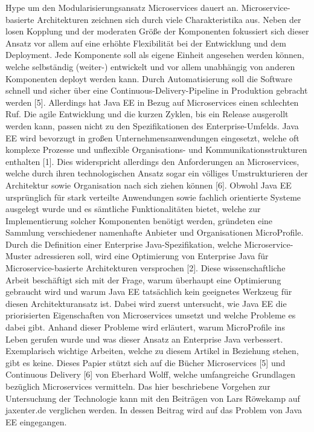  Hype um den Modularisierungsansatz Microservices dauert an. Microservice-basierte Architekturen zeichnen sich durch viele Charakteristika aus. Neben der losen Kopplung und der moderaten Größe der Komponenten fokussiert sich dieser Ansatz vor allem auf eine erhöhte Flexibilität bei der Entwicklung und dem Deployment. Jede Komponente soll als eigene Einheit angesehen werden können, welche selbständig (weiter-) entwickelt und vor allem unabhängig von anderen Komponenten deployt werden kann. Durch Automatisierung soll die Software schnell und sicher über eine Continuous-Delivery-Pipeline in Produktion gebracht werden [5]. Allerdings hat Java EE in Bezug auf Microservices einen schlechten Ruf. Die agile Entwicklung und die kurzen Zyklen, bis ein Release ausgerollt werden kann, passen nicht zu den Spezifikationen des Enterprise-Umfelds. Java EE wird bevorzugt in großen Unternehmensanwendungen eingesetzt, welche oft komplexe Prozesse und unflexible Organisations- und Kommunikationsstrukturen enthalten [1]. Dies widerspricht allerdings den Anforderungen an Microservices, welche durch ihren technologischen Ansatz sogar ein völliges Umstrukturieren der Architektur sowie Organisation nach sich ziehen können [6]. Obwohl Java EE ursprünglich für stark verteilte Anwendungen sowie fachlich orientierte Systeme ausgelegt wurde und es sämtliche Funktionalitäten bietet, welche zur Implementierung solcher Komponenten benötigt werden, gründeten eine Sammlung verschiedener namenhafte Anbieter und Organisationen MicroProfile.\\
Durch die Definition einer Enterprise Java-Spezifikation, welche Microservice-Muster adressieren soll, wird eine Optimierung von Enterprise Java für Microservice-basierte Architekturen versprochen [2]. Diese wissenschaftliche Arbeit beschäftigt sich mit der Frage, warum überhaupt eine Optimierung gebraucht wird und warum Java EE tatsächlich kein geeignetes Werkzeug für diesen Architekturansatz ist. Dabei wird zuerst untersucht, wie Java EE die priorisierten Eigenschaften von Microservices umsetzt und welche Probleme es dabei gibt. Anhand dieser Probleme wird erläutert, warum MicroProfile ins Leben gerufen wurde und was dieser Ansatz an Enterprise Java verbessert. \\
Exemplarisch wichtige Arbeiten, welche zu diesem Artikel in Beziehung stehen, gibt es keine. Dieses Papier stützt sich auf die Bücher Microservices [5] und Continuous Delivery [6] von Eberhard Wolff, welche umfangreiche Grundlagen bezüglich Microservices vermitteln. Das hier beschriebene Vorgehen zur Untersuchung der Technologie kann mit den Beiträgen von Lars Röwekamp auf jaxenter.de verglichen werden. In dessen Beitrag wird auf das Problem von Java EE eingegangen. 
